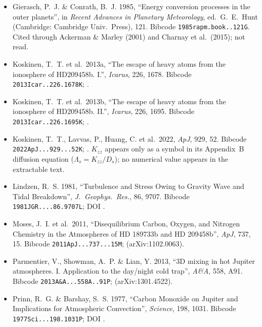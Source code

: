 \documentclass[english,a4paper]{my_memo}
\begin{document}
\begin{itemize}
\item Gierasch, P.~J. \& Conrath, B.~J. 1985, ``Energy conversion processes
in the outer planets'', in \textit{Recent Advances in Planetary
Meteorology}, ed.\ G.~E.\ Hunt (Cambridge: Cambridge Univ.\ Press), 121.
Bibcode \texttt{1985rapm.book..121G}. Cited through Ackerman \& Marley
(2001) and Charnay et al.\ (2015); not read.

\item Koskinen, T.~T. et al.\ 2013a, ``The escape of heavy atoms from the
ionosphere of HD209458b. I.'', \textit{Icarus}, 226, 1678.
Bibcode \texttt{2013Icar..226.1678K};
.

\item Koskinen, T.~T. et al.\ 2013b, ``The escape of heavy atoms from the
ionosphere of HD209458b. II.'', \textit{Icarus}, 226, 1695.
Bibcode \texttt{2013Icar..226.1695K};
.

\item Koskinen, T.~T., Lavvas, P., Huang, C. et al.\ 2022, \textit{ApJ},
929, 52. Bibcode \texttt{2022ApJ...929...52K};
. $K_{zz}$ appears only
as a symbol in its Appendix~B diffusion equation
($\Lambda_s = K_{zz}/D_s$); no numerical value appears in the extractable
text.

\item Lindzen, R.~S. 1981, ``Turbulence and Stress Owing to Gravity Wave and
Tidal Breakdown'', \textit{J.\ Geophys.\ Res.}, 86, 9707.
Bibcode \texttt{1981JGR....86.9707L}; DOI
.

\item Moses, J.~I. et al.\ 2011, ``Disequilibrium Carbon, Oxygen, and
Nitrogen Chemistry in the Atmospheres of HD 189733b and HD 209458b'',
\textit{ApJ}, 737, 15. Bibcode \texttt{2011ApJ...737...15M};
(arXiv:1102.0063).

\item Parmentier, V., Showman, A.~P. \& Lian, Y. 2013, ``3D mixing in hot
Jupiter atmospheres. I. Application to the day/night cold trap'',
\textit{A\&A}, 558, A91. Bibcode \texttt{2013A\&A...558A..91P};
(arXiv:1301.4522).

\item Prinn, R.~G. \& Barshay, S.~S. 1977, ``Carbon Monoxide on Jupiter and
Implications for Atmospheric Convection'', \textit{Science}, 198, 1031.
Bibcode \texttt{1977Sci...198.1031P}; DOI
.


\end{itemize}
\end{document}
